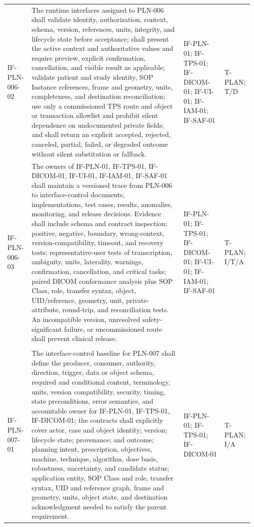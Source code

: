 \documentclass[11pt,letterpaper]{article}
\begin{document}
\begin{scriptsize}
\begin{longtable}{@{}L{0.14\textwidth}L{0.49\textwidth}L{0.19\textwidth}L{0.10\textwidth}@{}}
\addlinespace[2pt]
\mbox{IF-PLN-006-02} & The runtime interfaces assigned to PLN-006 shall validate identity, authorization, context, schema, version, references, units, integrity, and lifecycle state before acceptance; shall present the active context and authoritative values and require preview, explicit confirmation, cancellation, and visible result as applicable; validate patient and study identity, SOP Instance references, frame and geometry, units, completeness, and destination reconciliation; use only a commissioned TPS route and object or transaction allowlist and prohibit silent dependence on undocumented private fields; and shall return an explicit accepted, rejected, canceled, partial, failed, or degraded outcome without silent substitution or fallback. & IF-PLN-01; IF-TPS-01; IF-DICOM-01; IF-UI-01; IF-IAM-01; IF-SAF-01 & T-PLAN; T\slash\allowbreak{}D \\
\addlinespace[2pt]
\mbox{IF-PLN-006-03} & The owners of IF-PLN-01, IF-TPS-01, IF-DICOM-01, IF-UI-01, IF-IAM-01, IF-SAF-01 shall maintain a versioned trace from PLN-006 to interface-control documents, implementations, test cases, results, anomalies, monitoring, and release decisions. Evidence shall include schema and contract inspection; positive, negative, boundary, wrong-context, version-compatibility, timeout, and recovery tests; representative-user tests of transcription, ambiguity, units, laterality, warnings, confirmation, cancellation, and critical tasks; paired DICOM conformance analysis plus SOP Class, role, transfer syntax, object, UID\slash\allowbreak{}reference, geometry, unit, private-attribute, round-trip, and reconciliation tests. An incompatible version, unresolved safety-significant failure, or uncommissioned route shall prevent clinical release. & IF-PLN-01; IF-TPS-01; IF-DICOM-01; IF-UI-01; IF-IAM-01; IF-SAF-01 & T-PLAN; I\slash\allowbreak{}T\slash\allowbreak{}A \\
\addlinespace[2pt]
 \\
\addlinespace[2pt]
\mbox{IF-PLN-007-01} & The interface-control baseline for PLN-007 shall define the producer, consumer, authority, direction, trigger, data or object schema, required and conditional content, terminology, units, version compatibility, security, timing, state preconditions, error semantics, and accountable owner for IF-PLN-01, IF-TPS-01, IF-DICOM-01; the contracts shall explicitly cover actor, case and object identity; version; lifecycle state; provenance; and outcome; planning intent, prescription, objectives, machine, technique, algorithm, dose basis, robustness, uncertainty, and candidate status; application entity, SOP Class and role, transfer syntax, UID and reference graph, frame and geometry, units, object state, and destination acknowledgment needed to satisfy the parent requirement. & IF-PLN-01; IF-TPS-01; IF-DICOM-01 & T-PLAN; I\slash\allowbreak{}A \\

\end{longtable}
\end{scriptsize}
\end{document}
